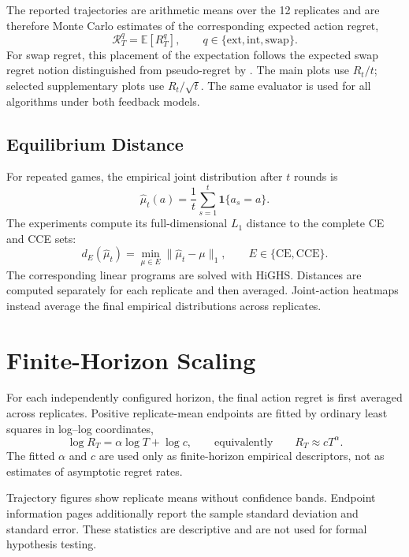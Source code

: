 The reported trajectories are arithmetic means over the 12 replicates and are
therefore Monte Carlo estimates of the corresponding expected action regret,
\[
    \mathcal R_T^q=\mathbb E[R_T^q],
    \qquad
    q\in\{\mathrm{ext},\mathrm{int},\mathrm{swap}\}.
\]
For swap regret, this placement of the expectation follows the expected swap
regret notion distinguished from pseudo-regret by
\citet{huang_near-optimal_2023}. The main plots use \(R_t/t\); selected
supplementary plots use
\(R_t/\sqrt t\). The same evaluator is used for all algorithms under both
feedback models.

\subsection{Equilibrium Distance}

For repeated games, the empirical joint distribution after \(t\) rounds is
\[
    \widehat{\mu}_t(a)
    =
    \frac{1}{t}\sum_{s=1}^{t}\mathbf 1\{a_s=a\}.
\]
The experiments compute its full-dimensional \(L_1\) distance to the complete
CE and CCE sets:
\[
    d_E(\widehat{\mu}_t)
    =
    \min_{\mu\in E}
    \|\widehat{\mu}_t-\mu\|_1,
    \qquad
    E\in\{\mathrm{CE},\mathrm{CCE}\}.
\]
The corresponding linear programs are solved with HiGHS. Distances are
computed separately for each replicate and then averaged. Joint-action
heatmaps instead average the final empirical distributions across replicates.

\section{Finite-Horizon Scaling}
\label{sec:scaling-and-reporting}

For each independently configured horizon, the final action regret is first
averaged across replicates. Positive replicate-mean endpoints are fitted by
ordinary least squares in log--log coordinates,
\[
    \log R_T=\alpha\log T+\log c,
    \qquad\text{equivalently}\qquad
    R_T\approx cT^\alpha.
\]
The fitted \(\alpha\) and \(c\) are used only as finite-horizon empirical
descriptors, not as estimates of asymptotic regret rates.

Trajectory figures show replicate means without confidence bands. Endpoint
information pages additionally report the sample standard deviation and
standard error. These statistics are descriptive and are not used for formal
hypothesis testing.
